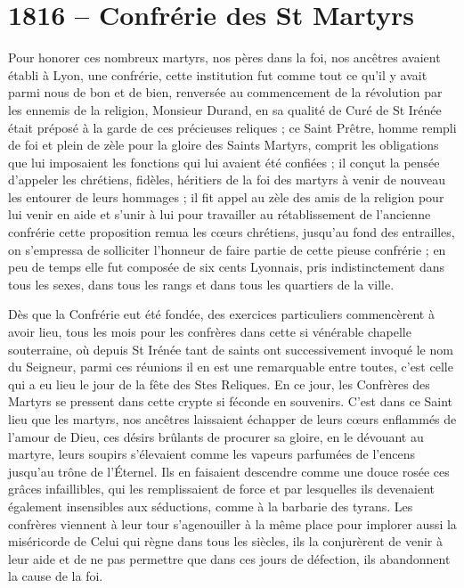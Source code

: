 \documentclass[11pt,a4paper]{report}
\begin{document}
\section*{1816 -- Confrérie des St Martyrs}

Pour honorer ces nombreux martyrs, nos pères dans la foi, nos ancêtres avaient établi à Lyon, une confrérie, cette institution fut comme tout ce qu'il y avait parmi nous de bon et de bien, renversée au commencement de la révolution par les ennemis de la religion, Monsieur Durand, en sa qualité de Curé de St Irénée était préposé à la garde de ces précieuses reliques ; ce Saint Prêtre, homme rempli de foi et plein de zèle pour la gloire des Saints Martyrs, comprit les obligations que lui imposaient les fonctions qui lui avaient été confiées ; il conçut la pensée d'appeler les chrétiens, fidèles, héritiers de la foi des martyrs à venir de nouveau les entourer de leurs hommages ; il fit appel au zèle des amis de la religion pour lui venir en aide et s'unir à lui pour travailler au rétablissement de l'ancienne confrérie cette proposition remua les cœurs chrétiens, jusqu'au fond des entrailles, on s'empressa de solliciter l'honneur de faire partie de cette pieuse confrérie ; en peu de temps elle fut composée de six cents Lyonnais, pris indistinctement dans tous les sexes, dans tous les rangs et dans tous les quartiers de la ville.

Dès que la Confrérie eut été fondée, des exercices particuliers commencèrent à avoir lieu, tous les mois pour les confrères dans cette si vénérable chapelle souterraine, où depuis St Irénée tant de saints ont successivement invoqué le nom du Seigneur, parmi ces réunions il en est une remarquable entre toutes, c'est celle qui a eu lieu le jour de la fête des Stes Reliques. En ce jour, les Confrères des Martyrs se pressent dans cette crypte si féconde en souvenirs. C'est dans ce Saint lieu que les martyrs, nos ancêtres laissaient échapper de leurs cœurs enflammés de l'amour de Dieu, ces désirs brûlants de procurer sa gloire, en le dévouant au martyre, leurs soupirs s'élevaient comme les vapeurs parfumées de l'encens jusqu'au trône de l'Éternel. Ils en faisaient descendre comme une douce rosée ces grâces infaillibles, qui les remplissaient de force et par lesquelles ils devenaient également insensibles aux séductions, comme à la barbarie des tyrans. Les confrères viennent à leur tour s'agenouiller à la même place pour implorer aussi la miséricorde de Celui qui règne dans tous les siècles, ils la conjurèrent de venir à leur aide et de ne pas permettre que dans ces jours de défection, ils abandonnent la cause de la foi.
\end{document}
